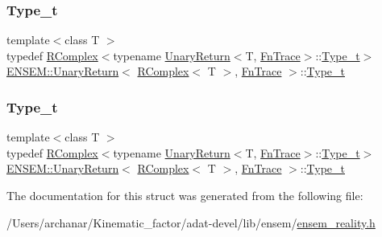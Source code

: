 \subsubsection{\texorpdfstring{Type\_t}{Type\_t}\hspace{0.1cm}{\footnotesize\ttfamily [2/3]}}
{\footnotesize\ttfamily template$<$class T $>$ \\
typedef \mbox{\hyperlink{classENSEM_1_1RComplex}{R\+Complex}}$<$typename \mbox{\hyperlink{structENSEM_1_1UnaryReturn}{Unary\+Return}}$<$T, \mbox{\hyperlink{structENSEM_1_1FnTrace}{Fn\+Trace}}$>$\+::\mbox{\hyperlink{structENSEM_1_1UnaryReturn_3_01RComplex_3_01T_01_4_00_01FnTrace_01_4_ad43642df789bc0ffa1a7589a833c8372}{Type\+\_\+t}}$>$ \mbox{\hyperlink{structENSEM_1_1UnaryReturn}{E\+N\+S\+E\+M\+::\+Unary\+Return}}$<$ \mbox{\hyperlink{classENSEM_1_1RComplex}{R\+Complex}}$<$ T $>$, \mbox{\hyperlink{structENSEM_1_1FnTrace}{Fn\+Trace}} $>$\+::\mbox{\hyperlink{structENSEM_1_1UnaryReturn_3_01RComplex_3_01T_01_4_00_01FnTrace_01_4_ad43642df789bc0ffa1a7589a833c8372}{Type\+\_\+t}}}

\mbox{\label{structENSEM_1_1UnaryReturn_3_01RComplex_3_01T_01_4_00_01FnTrace_01_4_ad43642df789bc0ffa1a7589a833c8372}} 
\subsubsection{\texorpdfstring{Type\_t}{Type\_t}\hspace{0.1cm}{\footnotesize\ttfamily [3/3]}}
{\footnotesize\ttfamily template$<$class T $>$ \\
typedef \mbox{\hyperlink{classENSEM_1_1RComplex}{R\+Complex}}$<$typename \mbox{\hyperlink{structENSEM_1_1UnaryReturn}{Unary\+Return}}$<$T, \mbox{\hyperlink{structENSEM_1_1FnTrace}{Fn\+Trace}}$>$\+::\mbox{\hyperlink{structENSEM_1_1UnaryReturn_3_01RComplex_3_01T_01_4_00_01FnTrace_01_4_ad43642df789bc0ffa1a7589a833c8372}{Type\+\_\+t}}$>$ \mbox{\hyperlink{structENSEM_1_1UnaryReturn}{E\+N\+S\+E\+M\+::\+Unary\+Return}}$<$ \mbox{\hyperlink{classENSEM_1_1RComplex}{R\+Complex}}$<$ T $>$, \mbox{\hyperlink{structENSEM_1_1FnTrace}{Fn\+Trace}} $>$\+::\mbox{\hyperlink{structENSEM_1_1UnaryReturn_3_01RComplex_3_01T_01_4_00_01FnTrace_01_4_ad43642df789bc0ffa1a7589a833c8372}{Type\+\_\+t}}}



The documentation for this struct was generated from the following file\+:\begin{DoxyCompactItemize}
\item 
/\+Users/archanar/\+Kinematic\+\_\+factor/adat-\/devel/lib/ensem/\mbox{\hyperlink{adat-devel_2lib_2ensem_2ensem__reality_8h}{ensem\+\_\+reality.\+h}}\end{DoxyCompactItemize}
